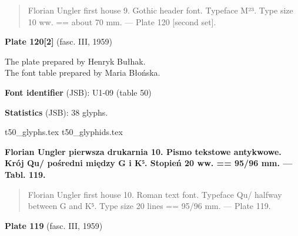 \documentclass[12pt]{article}
\newcommand{\bg}{\begingl}
\newcommand{\pismoPL}[1]{{\relsize{2}\Junicode\textbf{#1}}}
\newcommand{\pismoEN}[1]{{\relsize{1}\Junicode\begin{quote}#1\end{quote}}}
\newcommand{\plate}[3]{\textbf{Plate #1} (fasc. #2, #3)}
\newcommand{\exampleBib}[1]{{\relsize{2}\Junicode\textbf{The
      example:}\\[2ex] CATALOGUS LIBRORUM \textbf{#1}}}
\newcommand{\exampleDesc}[1]{{\relsize{0}\Junicode#1}}
\newcommand{\exampleLib}[1]{{\relsize{0}\Junicode \textbf{Library:} #1}}
\newcommand{\examplePL}[1]{}
\newcommand{\exampleEN}[1]{}
\newcommand{\fontID}[2]{{\relsize{1}\Junicode\textbf{Font identifier} (JSB): #1 (table #2)}}
\newcommand{\fontstat}[1]{{\relsize{1}\Junicode\textbf{Statistics} (JSB): #1 glyphs.}}
\newcommand{\exampleRef}[1]{{\relsize{0}\Junicode \textbf{References:} #1}}
\newcommand{\examplePage}[1]{{Page reference: \relsize{0}\Junicode#1}}
\begin{document}
 \pismoEN{Florian Ungler first house 9. Gothic header font. Typeface
   M²³. Type size 10 ww. == about 70 mm. — Plate 120 [second set].}

\plate{120[2]}{III}{1959}

The plate prepared by Henryk Bułhak.\\
The font table prepared by  Maria Błońska.

\bigskip




  







\bigskip

\fontID{U1-09}{50}

\fontstat{38}

  {t50_glyphs.tex}
  {t50_glyphids.tex}


 \newpage
 
% 

 

 \pismoPL{Florian Ungler pierwsza drukarnia 10. Pismo tekstowe
   antykwowe. Krój Qu/ pośredni między G i K⁵. Stopień 20 ww. == 95/96
   mm. — Tabl. 119.}
  
 \pismoEN{Florian Ungler  first house 10. Roman text font. Typeface Qu/ halfway between G and K⁵. Type size 20 lines == 95/96
   mm. — Plate 119.}

\plate{119}{III}{1959}
\end{document}
